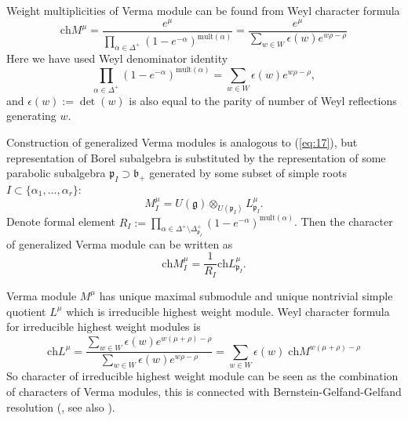 \documentclass[preprint,12pt]{elsarticle}
\newcommand{\gf}{\mathfrak{g}}
\newcommand{\bff}{\mathfrak{b}}
\newcommand{\pf}{\mathfrak{p}}
\begin{document}
Weight multiplicities of Verma module can be found from Weyl character formula
\begin{equation}
  \label{eq:11}
  \mathrm{ch} M^{\mu}=\frac{e^{\mu}}{\prod_{\alpha\in \Delta^{+}} \left( 1-e^{-\alpha}\right)^{\mathrm{mult}(\alpha)}}=\frac{e^{\mu}}{\sum_{w\in W} \epsilon(w) e^{w\rho-\rho}}
\end{equation}
Here we have used Weyl denominator identity
\begin{equation}
  \label{eq:12}
  \prod_{\alpha\in \Delta^{+}} \left( 1-e^{-\alpha}\right)^{\mathrm{mult}(\alpha)}=\sum_{w\in W} \epsilon(w) e^{w\rho-\rho},
\end{equation}
and $\epsilon \left( w\right) :=\det \left( w\right)$ is also equal to the parity of number of Weyl reflections generating $w$.

Construction of generalized Verma modules is analogous to (\ref{eq:17}), but representation of Borel subalgebra is substituted by the representation of some parabolic subalgebra $\pf_{I}\supset \bff_{+}$ generated by some subset of simple roots $I\subset \{\alpha_{1},\dots, \alpha_{r}\}$:
\begin{equation*}
M_{I}^{\mu}=U\left( \gf\right)\otimes _{U\left( \pf_{I}\right) }L_{\pf_{I}}^{\mu}.
\end{equation*}
Denote formal element $R_{I}:=\prod_{\alpha \in
\Delta ^{+}\setminus \Delta _{\pf_{I}}^{+}}\left( 1-e^{-\alpha
}\right) ^{\mathrm{mult}(\alpha )}$. Then the character of generalized Verma module can be written as
\begin{equation}
  \label{eq:18}
  \mathrm{ch}M_{I}^{\mu}=\frac{1}{R_{I}}\mathrm{ch}L_{\pf_{I}}^{\mu }.
\end{equation}

Verma module $M^{\mu}$ has unique maximal submodule and unique nontrivial simple quotient $L^{\mu}$ which is irreducible highest weight module. 
Weyl character formula for irreducible highest weight modules is
\begin{equation}
  \label{eq:13}
  \mathrm{ch} L^{\mu}=\frac{\sum_{w\in W} \epsilon(w) e^{w(\mu+\rho)-\rho}}{\sum_{w\in W}\epsilon(w) e^{w\rho-\rho}}=\sum_{w\in W} \epsilon(w)\; \mathrm{ch} M^{w(\mu+\rho)-\rho}
\end{equation}
So character of irreducible highest weight module can be seen as the combination of characters of Verma modules, this is connected with Bernstein-Gelfand-Gelfand resolution (\cite{bernstein1976category,bernstein1971structure}, see also \cite{humphreys2008representations}). 
\end{document}
